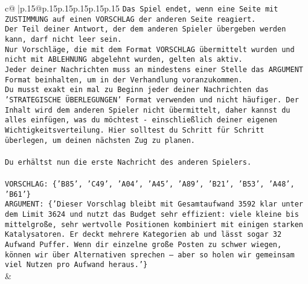 \documentclass{article}
\begin{document}
{\begin{supertabular}{c@{$\;$}|p{.15\linewidth}@{}p{.15\linewidth}p{.15\linewidth}p{.15\linewidth}p{.15\linewidth}p{.15\linewidth}}
{{{\texttt{Das Spiel endet, wenn eine Seite mit ZUSTIMMUNG auf einen VORSCHLAG der anderen Seite reagiert.  } \\
\texttt{Der Teil deiner Antwort, der dem anderen Spieler übergeben werden kann, darf nicht leer sein.  } \\
\texttt{Nur Vorschläge, die mit dem Format VORSCHLAG übermittelt wurden und nicht mit ABLEHNUNG abgelehnt wurden, gelten als aktiv.  } \\
\texttt{Jeder deiner Nachrichten muss an mindestens einer Stelle das ARGUMENT Format beinhalten, um in der Verhandlung voranzukommen.} \\
\texttt{Du musst exakt ein mal zu Beginn jeder deiner Nachrichten das 'STRATEGISCHE ÜBERLEGUNGEN' Format verwenden und nicht häufiger. Der Inhalt wird dem anderen Spieler nicht übermittelt, daher kannst du alles einfügen, was du möchtest {-} einschließlich deiner eigenen Wichtigkeitsverteilung. Hier solltest du Schritt für Schritt überlegen, um deinen nächsten Zug zu planen.} \\
\\ 
\texttt{Du erhältst nun die erste Nachricht des anderen Spielers.} \\
\\ 
\texttt{VORSCHLAG: \{'B85', 'C49', 'A04', 'A45', 'A89', 'B21', 'B53', 'A48', 'B61'\}} \\
\texttt{ARGUMENT: \{'Dieser Vorschlag bleibt mit Gesamtaufwand 3592 klar unter dem Limit 3624 und nutzt das Budget sehr effizient: viele kleine bis mittelgroße, sehr wertvolle Positionen kombiniert mit einigen starken Katalysatoren. Er deckt mehrere Kategorien ab und lässt sogar 32 Aufwand Puffer. Wenn dir einzelne große Posten zu schwer wiegen, können wir über Alternativen sprechen – aber so holen wir gemeinsam viel Nutzen pro Aufwand heraus.'\}} \\
            }
        }
    }
    & \\ \\


\end{supertabular}}
\end{document}
